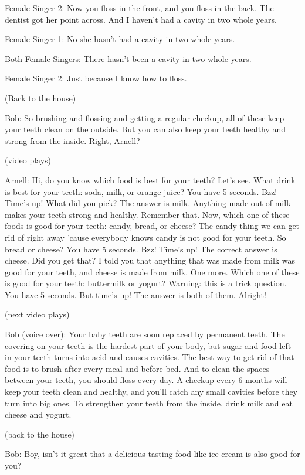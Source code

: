 Female Singer 2: Now you floss in the front, and you floss in the back. The dentist got her point across. And I haven't had a cavity in two whole years.

Female Singer 1: No she hasn't had a cavity in two whole years.

Both Female Singers: There hasn't been a cavity in two whole years.

Female Singer 2: Just because I know how to floss.

(Back to the house)

Bob: So brushing and flossing and getting a regular checkup, all of these keep your teeth clean on the outside. But you can also keep your teeth healthy and strong from the inside. Right, Arnell?

(video plays)

Arnell: Hi, do you know which food is best for your teeth? Let's see. What drink is best for your teeth: soda, milk, or orange juice? You have 5 seconds. Bzz! Time's up! What did you pick? The answer is milk. Anything made out of milk makes your teeth strong and healthy. Remember that. Now, which one of these foods is good for your teeth: candy, bread, or cheese? The candy thing we can get rid of right away 'cause everybody knows candy is not good for your teeth. So bread or cheese? You have 5 seconds. Bzz! Time's up! The correct answer is cheese. Did you get that? I told you that anything that was made from milk was good for your teeth, and cheese is made from milk. One more. Which one of these is good for your teeth: buttermilk or yogurt? Warning: this is a trick question. You have 5 seconds. But time's up! The answer is both of them. Alright!

(next video plays)

Bob (voice over): Your baby teeth are soon replaced by permanent teeth. The covering on your teeth is the hardest part of your body, but sugar and food left in your teeth turns into acid and causes cavities. The best way to get rid of that food is to brush after every meal and before bed. And to clean the spaces between your teeth, you should floss every day. A checkup every 6 months will keep your teeth clean and healthy, and you'll catch any small cavities before they turn into big ones. To strengthen your teeth from the inside, drink milk and eat cheese and yogurt.

(back to the house)

Bob: Boy, isn't it great that a delicious tasting food like ice cream is also good for you?

